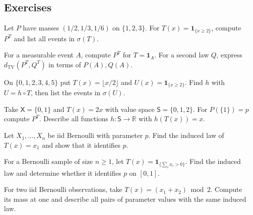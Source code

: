 \documentclass[11pt,oneside]{book}
\theoremstyle{definition}
\theoremstyle{remark}
\newcommand{\R}{\mathbb R}
\begin{document}
\subsection{Exercises}
\label{subsec:practice-4-1}

\begin{practiceexercise}
\label{pex:statistic-two-cell-law}
Let $P$ have masses $(1/2,1/3,1/6)$ on $\{1,2,3\}$.
For $T(x)=\mathbf 1_{\{x\geq2\}}$, compute $P^T$ and list all
events in $\sigma(T)$.
\end{practiceexercise}

\begin{practiceexercise}
\label{pex:statistic-indicator-law}
For a measurable event $A$, compute $P^T$ for $T=\mathbf 1_A$.
For a second law $Q$, express $d_{\mathrm{TV}}(P^T,Q^T)$ in terms
of $P(A),Q(A)$.
\end{practiceexercise}

\begin{practiceexercise}
\label{pex:statistic-grouped-law}
On $\{0,1,2,3,4,5\}$ put $T(x)=\lfloor x/2\rfloor$ and
$U(x)=\mathbf 1_{\{x\geq2\}}$. Find $h$ with $U=h\circ T$,
then list the events in $\sigma(U)$.
\end{practiceexercise}

\begin{practiceexercise}
\label{pex:statistic-unused-values}
Take $\mathsf X=\{0,1\}$ and $T(x)=2x$ with value space
$\mathsf S=\{0,1,2\}$. For $P(\{1\})=p$ compute $P^T$.
Describe all functions $h:\mathsf S\to\R$ with $h(T(x))=x$.
\end{practiceexercise}

\begin{practiceexercise}
\label{pex:statistic-first-coordinate}
Let $X_1,\ldots,X_n$ be iid Bernoulli with parameter $p$.
Find the induced law of $T(x)=x_1$ and show that it identifies $p$.
\end{practiceexercise}

\begin{practiceexercise}
\label{pex:statistic-any-success}
For a Bernoulli sample of size $n\geq1$, let
$T(x)=\mathbf 1_{\{\sum_i x_i>0\}}$.
Find the induced law and determine whether it identifies $p$ on $[0,1]$.
\end{practiceexercise}

\begin{practiceexercise}
\label{pex:statistic-count-parity}
For two iid Bernoulli observations, take
$T(x)=(x_1+x_2)\bmod2$. Compute its mass at one and describe
all pairs of parameter values with the same induced law.
\end{practiceexercise}
\end{document}
